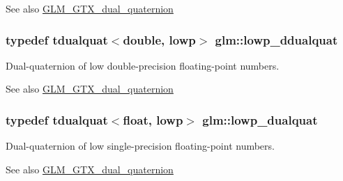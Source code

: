 \begin{DoxySeeAlso}{See also}
\hyperlink{group__gtx__dual__quaternion}{G\+L\+M\+\_\+\+G\+T\+X\+\_\+dual\+\_\+quaternion} 
\end{DoxySeeAlso}
\hypertarget{group__gtx__dual__quaternion_ga361a2ea6cce1446a8ab7e7803156c16c}{}
\subsubsection[{lowp\+\_\+ddualquat}]{\setlength{\rightskip}{0pt plus 5cm}typedef tdualquat$<$double, lowp$>$ {\bf glm\+::lowp\+\_\+ddualquat}}\label{group__gtx__dual__quaternion_ga361a2ea6cce1446a8ab7e7803156c16c}
Dual-\/quaternion of low double-\/precision floating-\/point numbers.

\begin{DoxySeeAlso}{See also}
\hyperlink{group__gtx__dual__quaternion}{G\+L\+M\+\_\+\+G\+T\+X\+\_\+dual\+\_\+quaternion} 
\end{DoxySeeAlso}
\hypertarget{group__gtx__dual__quaternion_ga4888200ed911e4887c2423fed74ad362}{}
\subsubsection[{lowp\+\_\+dualquat}]{\setlength{\rightskip}{0pt plus 5cm}typedef tdualquat$<$float, lowp$>$ {\bf glm\+::lowp\+\_\+dualquat}}\label{group__gtx__dual__quaternion_ga4888200ed911e4887c2423fed74ad362}
Dual-\/quaternion of low single-\/precision floating-\/point numbers.

\begin{DoxySeeAlso}{See also}
\hyperlink{group__gtx__dual__quaternion}{G\+L\+M\+\_\+\+G\+T\+X\+\_\+dual\+\_\+quaternion} 
\end{DoxySeeAlso}
\hypertarget{group__gtx__dual__quaternion_ga797f6d2679ab6773c1f057b97bf95111}{}
